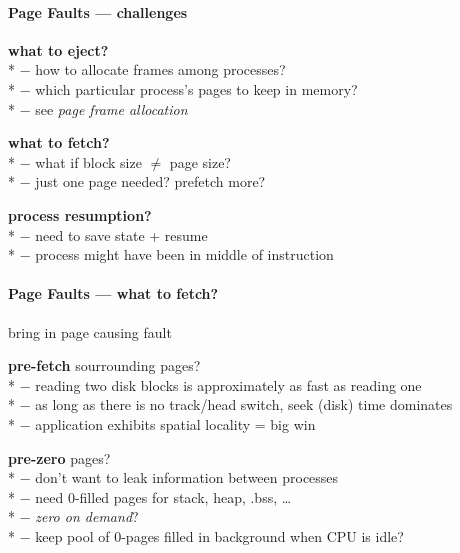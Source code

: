 \paragraph{Page Faults --- challenges}
\begin{items}
  \item \textbf{what to eject?} \\*
    $ - $ how to allocate frames among processes? \\*
    $ - $ which particular process's pages to keep in memory? \\*
    $ - $ see \emph{page frame allocation}
  \item \textbf{what to fetch?} \\*
    $ - $ what if block size $ \neq $ page size? \\*
    $ - $ just one page needed? prefetch more?
  \item \textbf{process resumption?} \\*
    $ - $ need to save state + resume \\*
    $ - $ process might have been in middle of instruction
\end{items}

\paragraph{Page Faults --- what to fetch?}
\begin{items}
  \item bring in page causing fault
  \item \textbf{pre-fetch} sourrounding pages? \\*
    $ - $ reading two disk blocks is approximately as fast as reading one \\*
    $ - $ as long as there is no track/head switch, seek (disk) time dominates \\*
    $ - $ application exhibits spatial locality = big win
  \item \textbf{pre-zero} pages? \\*
    $ - $ don't want to leak information between processes \\*
    $ - $ need 0-filled pages for stack, heap, .bss, \dots \\*
    $ - $ \emph{zero on demand}? \\*
    $ - $ keep pool of 0-pages filled in background when CPU is idle?
\end{items}

